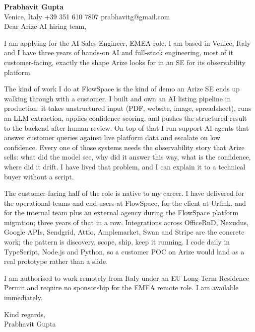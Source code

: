 \documentclass[a4paper,10.5pt]{article}
\begin{document}
\textbf{Prabhavit Gupta}\\
Venice, Italy \textbar{} +39 351 610 7807 \textbar{} prabhavitg@gmail.com\\[10pt]
Dear Arize AI hiring team,

I am applying for the AI Sales Engineer, EMEA role. I am based in Venice, Italy and I have three years of hands-on AI and full-stack engineering, most of it customer-facing, exactly the shape Arize looks for in an SE for its observability platform.

The kind of work I do at FlowSpace is the kind of demo an Arize SE ends up walking through with a customer. I built and own an AI listing pipeline in production: it takes unstructured input (PDF, website, image, spreadsheet), runs an LLM extraction, applies confidence scoring, and pushes the structured result to the backend after human review. On top of that I run support AI agents that answer customer queries against live platform data and escalate on low confidence. Every one of those systems needs the observability story that Arize sells: what did the model see, why did it answer this way, what is the confidence, where did it drift. I have lived that problem, and I can explain it to a technical buyer without a script.

The customer-facing half of the role is native to my career. I have delivered for the operational teams and end users at FlowSpace, for the client at Urlink, and for the internal team plus an external agency during the FlowSpace platform migration; three years of that in a row. Integrations across OfficeRnD, Nexudus, Google APIs, Sendgrid, Attio, Amplemarket, Swan and Stripe are the concrete work; the pattern is discovery, scope, ship, keep it running. I code daily in TypeScript, Node.js and Python, so a customer POC on Arize would land as a real prototype rather than a slide.

I am authorised to work remotely from Italy under an EU Long-Term Residence Permit and require no sponsorship for the EMEA remote role. I am available immediately.

Kind regards,\\
Prabhavit Gupta
\end{document}
